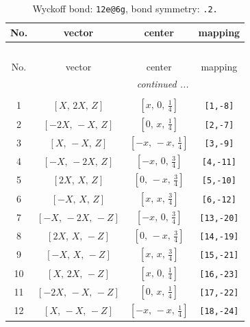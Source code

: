\documentclass[fleqn,8pt]{jsarticle}
\begin{document}
\renewcommand{\arraystretch}{1.2}
\begin{longtable}{cccc}
\caption{Wyckoff bond: {\tt 12e@6g}, bond symmetry: {\tt .2.}}
 \\
 \hline \hline
No. & vector & center & mapping \\ \hline \endfirsthead

\multicolumn{3}{l}{\tablename\ \thetable{}} \\
 \hline \hline
No. & vector & center & mapping \\ \hline \endhead

 \hline \hline
\multicolumn{3}{r}{\footnotesize\it continued ...} \\ \endfoot

 \hline \hline
\multicolumn{3}{r}{} \\ \endlastfoot

1 & $\left[ X,\, 2 X,\, Z \right]$ & $\left[ x,\, 0,\, \frac{1}{4} \right]$ & {\tt [1,-8]} \\ \hline
2 & $\left[ - 2 X,\, - X,\, Z \right]$ & $\left[ 0,\, x,\, \frac{1}{4} \right]$ & {\tt [2,-7]} \\ \hline
3 & $\left[ X,\, - X,\, Z \right]$ & $\left[ - x,\, - x,\, \frac{1}{4} \right]$ & {\tt [3,-9]} \\ \hline
4 & $\left[ - X,\, - 2 X,\, Z \right]$ & $\left[ - x,\, 0,\, \frac{3}{4} \right]$ & {\tt [4,-11]} \\ \hline
5 & $\left[ 2 X,\, X,\, Z \right]$ & $\left[ 0,\, - x,\, \frac{3}{4} \right]$ & {\tt [5,-10]} \\ \hline
6 & $\left[ - X,\, X,\, Z \right]$ & $\left[ x,\, x,\, \frac{3}{4} \right]$ & {\tt [6,-12]} \\ \hline
7 & $\left[ - X,\, - 2 X,\, - Z \right]$ & $\left[ - x,\, 0,\, \frac{3}{4} \right]$ & {\tt [13,-20]} \\ \hline
8 & $\left[ 2 X,\, X,\, - Z \right]$ & $\left[ 0,\, - x,\, \frac{3}{4} \right]$ & {\tt [14,-19]} \\ \hline
9 & $\left[ - X,\, X,\, - Z \right]$ & $\left[ x,\, x,\, \frac{3}{4} \right]$ & {\tt [15,-21]} \\ \hline
10 & $\left[ X,\, 2 X,\, - Z \right]$ & $\left[ x,\, 0,\, \frac{1}{4} \right]$ & {\tt [16,-23]} \\ \hline
11 & $\left[ - 2 X,\, - X,\, - Z \right]$ & $\left[ 0,\, x,\, \frac{1}{4} \right]$ & {\tt [17,-22]} \\ \hline
12 & $\left[ X,\, - X,\, - Z \right]$ & $\left[ - x,\, - x,\, \frac{1}{4} \right]$ & {\tt [18,-24]} \\
\end{longtable}
\end{document}
